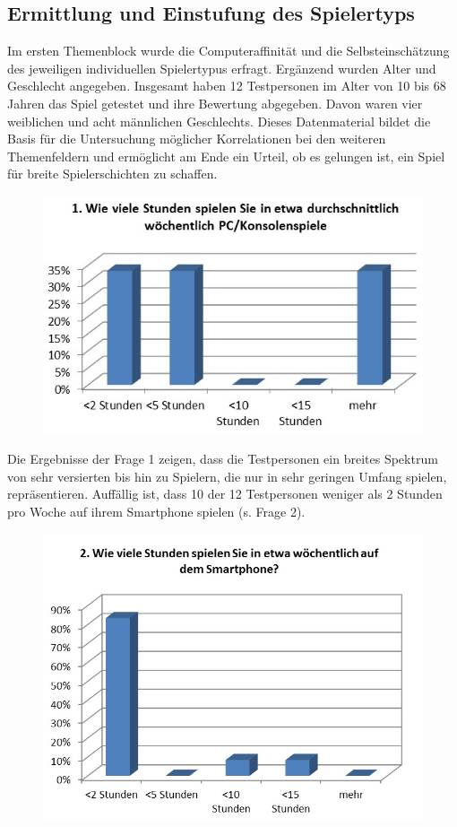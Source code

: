 \documentclass[extern,palatino]{cgBA}
\begin{document}
\subsection{Ermittlung und Einstufung des Spielertyps}
Im ersten Themenblock wurde die Computeraffinität und die Selbsteinschätzung des jeweiligen individuellen Spielertypus erfragt. Ergänzend wurden Alter und Geschlecht angegeben. Insgesamt haben 12 Testpersonen im Alter von 10 bis 68 Jahren das Spiel getestet und ihre Bewertung abgegeben. Davon waren vier weiblichen und acht männlichen Geschlechts. Dieses Datenmaterial bildet die Basis für die Untersuchung möglicher Korrelationen bei den weiteren Themenfeldern und ermöglicht am Ende ein Urteil, ob es gelungen ist, ein Spiel für breite Spielerschichten zu schaffen. 
\begin{figure}[H]
	\centering
	\includegraphics[width=1\textwidth]{table0.jpg}
\end{figure}
Die Ergebnisse der Frage 1 zeigen, dass die Testpersonen ein breites Spektrum von sehr versierten bis hin zu Spielern, die nur in sehr geringen Umfang spielen, repräsentieren. Auffällig ist, dass 10 der 12 Testpersonen weniger als 2 Stunden pro Woche auf ihrem Smartphone spielen (s. Frage 2).
\begin{figure}[H]
	\centering
	\includegraphics[width=1\textwidth]{table1.jpg}
\end{figure}
\end{document}
